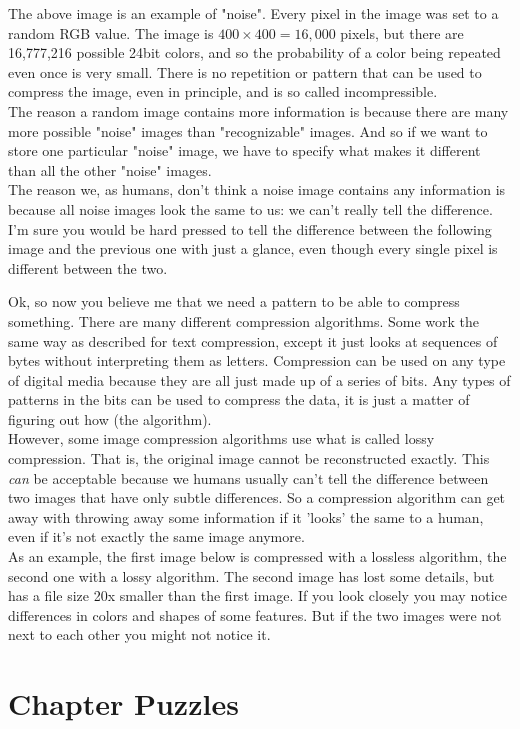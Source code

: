 The above image is an example of "noise". Every pixel in the image was set to a random RGB value. The image is \(400 \times 400 = 16,000\) pixels, but there are 16,777,216 possible 24bit colors, and so the probability of a color being repeated even once is very small. There is no repetition or pattern that can be used to compress the image, even in principle, and is so called incompressible.\\

The reason a random image contains more information is because there are many more possible "noise" images than "recognizable" images. And so if we want to store one particular "noise" image, we have to specify what makes it different than all the other "noise" images.\\

The reason we, as humans, don't think a noise image contains any information is because all noise images look the same to us: we can't really tell the difference. I'm sure you would be hard pressed to tell the difference between the following image and the previous one with just a glance, even though every single pixel is different between the two.\\

\begin{center}\end{center}

Ok, so now you believe me that we need a pattern to be able to compress something. There are many different compression algorithms. Some work the same way as described for text compression, except it just looks at sequences of bytes without interpreting them as letters. Compression can be used on any type of digital media because they are all just made up of a series of bits. Any types of patterns in the bits can be used to compress the data, it is just a matter of figuring out how (the algorithm).\\

However, some image compression algorithms use what is called lossy compression. That is, the original image cannot be reconstructed exactly. This \textit{can} be acceptable because we humans usually can't tell the difference between two images that have only subtle differences. So a compression algorithm can get away with throwing away some information if it 'looks' the same to a human, even if it's not exactly the same image anymore.\\

As an example, the first image below is compressed with a lossless algorithm, the second one with a lossy algorithm. The second image has lost some details, but has a file size 20x smaller than the first image. If you look closely you may notice differences in colors and shapes of some features. But if the two images were not next to each other you might not notice it.

\begin{center}\end{center}
\begin{center}\end{center}

\section{Chapter Puzzles}